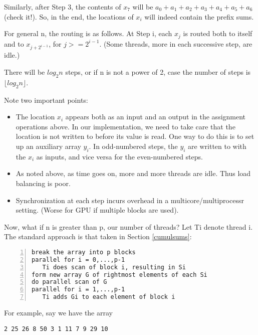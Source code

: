 Similarly, after Step 3, the contents of $x_7$ will be
$a_0+a_1+a_2+a_3 + a_4+a_5+a_6$ (check it!).   So, in the end, the
locations of $x_i$ will indeed contain the prefix sums.

For general n, the routing is as follows.  At Step i, each $x_j$ is
routed both to itself and to $x_{j+2^{i-1}}$, for $j >= 2^{i-1}$.  
(Some threads, more in each successive step, are idle.)

There will be $log_2 n$ steps, or if n is not a power of 2, case the
number of steps is $\lfloor log_2 n \rfloor$.

Note two important points:

\begin{itemize}

\item The location $x_i$ appears both as an input and an output in the
assignment operations above.  In our implementation, we need to take
care that the location is not written to before its value is read.  One
way to do this is to set up an auxiliary array $y_i$.  In odd-numbered
steps, the $y_i$ are written to with the $x_i$ as inputs, and vice versa
for the even-numbered steps.

\item As noted above, as time goes on, more and more threads are idle.  
Thus load balancing is poor.

\item Synchronization at each step incurs overhead in a
multicore/multiprocessr setting.  (Worse for GPU if multiple blocks
are used).

\end{itemize}

Now, what if n is greater than p, our number of threads?  Let
Ti denote thread i.  The standard approach is that taken in Section
\ref{cumulsums}:

\begin{lstlisting}[numbers=left]
break the array into p blocks
parallel for i = 0,...,p-1
   Ti does scan of block i, resulting in Si
form new array G of rightmost elements of each Si
do parallel scan of G
parallel for i = 1,...,p-1
   Ti adds Gi to each element of block i
\end{lstlisting}

For example, say we have the array

\begin{Verbatim}[fontsize=\relsize{-2}]
2 25 26 8 50 3 1 11 7 9 29 10
\end{Verbatim}

